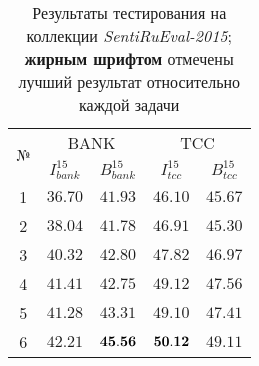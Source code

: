 \begin{table}[ht!]
\centering
\caption{Результаты тестирования на коллекции {\it SentiRuEval-2015};
   {\bf жирным шрифтом} отмечены лучший результат относительно каждой задачи
}
\label{table:results2015}
\begin{tabular}{ccccc}
\hline
\multicolumn{1}{c|}{\multirow{2}{*}{№}} & \multicolumn{2}{c|}{BANK}                                                   & \multicolumn{2}{c}{TCC}                                                  \\ \cline{2-5}
\multicolumn{1}{c|}{}                   & \multicolumn{1}{c|}{$I_{bank}^{15}$} & \multicolumn{1}{c|}{$B_{bank}^{15}$} & \multicolumn{1}{c|}{$I_{tcc}^{15}$} & \multicolumn{1}{c}{$B_{tcc}^{15}$} \\ \hline
1                                       & $36.70$                              & $41.93$                        & $46.10$                       & $45.67$                            \\
2                                       & $38.04$                              & $41.78$                        & $46.91$                       & $45.30$                            \\
3                                       & $40.32$                              & $42.80$                        & $47.82$                       & $46.97$                            \\
4                                       & $41.41$                              & $42.75$                        & $49.12$                       & $47.56$                            \\
5                                       & $41.28$                              & $43.31$                        & $49.10$                       & $47.41$                            \\
6                                       & $42.21$                              & ${\bf 45.56}$                  & ${\bf 50.12}$                 & $49.11$                            \\ \hline
\end{tabular}
\end{table}

